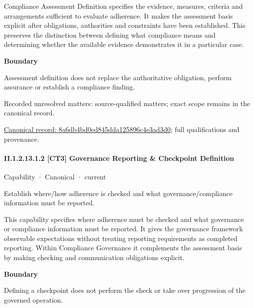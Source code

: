 Compliance Assessment Definition specifies the evidence, measures, criteria and arrangements sufficient to evaluate adherence. It makes the assessment basis explicit after obligations, authorities and constraints have been established. This preserves the distinction between defining what compliance means and determining whether the available evidence demonstrates it in a particular case.



\textbf{Boundary}



Assessment definition does not replace the authoritative obligation, perform assurance or establish a compliance finding.


{\small Recorded unresolved matters: source-qualified matters; exact scope remains in the canonical record.}\par
{\footnotesize \href{../../../../../../../continuum/strategy/capability/8a6db4bd0ed845dda125896c4e3ad3d0.md}{Canonical record: 8a6db4bd0ed845dda125896c4e3ad3d0}; full qualifications and provenance.}\par
\paragraph*{II.1.2.13.1.2 [CT3] Governance Reporting \& Checkpoint Definition}
\label{navigation:II.1.2.13.1.2}

\label{element:0ff9f332acdc435e98f4f527c74f60c9}
{\small Capability · Canonical · current}\par

Establish where/how adherence is checked and what governance/compliance information must be reported.



This capability specifies where adherence must be checked and what governance or compliance information must be reported. It gives the governance framework observable expectations without treating reporting requirements as completed reporting. Within Compliance Governance it complements the assessment basis by making checking and communication obligations explicit.



\textbf{Boundary}



Defining a checkpoint does not perform the check or take over progression of the governed operation.


